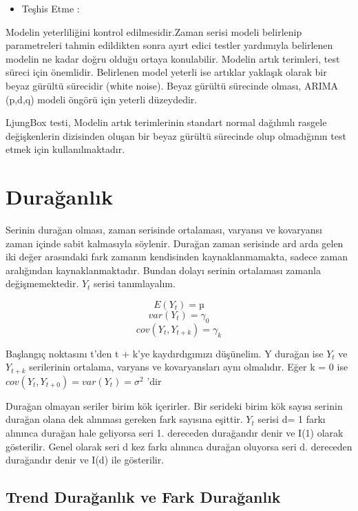 \documentclass[11pt]{article}
\providecommand{\tightlist}{%
      \setlength{\itemsep}{0pt}\setlength{\parskip}{0pt}}
\begin{document}
\begin{itemize}
\tightlist
\item
  Teşhis Etme :
\end{itemize}

Modelin yeterliliğini kontrol edilmesidir.Zaman serisi modeli belirlenip
parametreleri tahmin edildikten sonra ayırt edici testler yardımıyla
belirlenen modelin ne kadar doğru olduğu ortaya konulabilir. Modelin
artık terimleri, test süreci için önemlidir. Belirlenen model yeterli
ise artıklar yaklaşık olarak bir beyaz gürültü sürecidir (white noise).
Beyaz gürültü sürecinde olması, ARIMA (p,d,q) modeli öngörü için yeterli
düzeydedir.

LjungBox testi, Modelin artık terimlerinin standart normal dağılımlı
rasgele değişkenlerin dizisinden oluşan bir beyaz gürültü sürecinde olup
olmadığının test etmek için kullanılmaktadır.

    \section{Durağanlık}\label{duraux11fanlux131k}

Serinin durağan olması, zaman serisinde ortalaması, varyansı ve
kovaryansı zaman içinde sabit kalmasıyla söylenir. Durağan zaman
serisinde ard arda gelen iki değer arasındaki fark zamanın kendisinden
kaynaklanmamakta, sadece zaman aralığından kaynaklanmaktadır. Bundan
dolayı serinin ortalaması zamanla değişmemektedir. \(Y_{t}\) serisi
tanımlayalım.

\[ E(Y_{t}) = µ \] \[ var(Y_{t}) = γ_{0} \]
\[ cov(Y_{t},Y_{t+k} ) = γ_{k} \]

Başlangıç noktasını t'den t + k'ye kaydırdıgımızı düşünelim. Y durağan
ise \(Y_{t}\) ve \(Y_{t+k}\) serilerinin ortalama, varyans ve
kovaryansları aynı olmalıdır. Eğer k = 0 ise
\(cov(Y_{t}, Y_{t+0}) = var(Y_{t}) = σ^2\) 'dir

Durağan olmayan seriler birim kök içerirler. Bir serideki birim kök
sayısı serinin durağan olana dek alınması gereken fark sayısına eşittir.
\(Y_{t}\) serisi d= 1 farkı alınınca durağan hale geliyorsa seri 1.
dereceden durağandır denir ve I(1) olarak gösterilir. Genel olarak seri
d kez farkı alınınca durağan oluyorsa seri d. dereceden durağandır denir
ve I(d) ile gösterilir.

\subsection{Trend Durağanlık ve Fark
Durağanlık}\label{trend-duraux11fanlux131k-ve-fark-duraux11fanlux131k}
\end{document}
